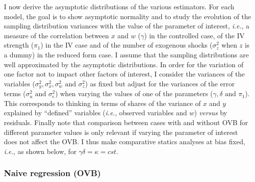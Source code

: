 \documentclass[usletter, 12pt]{article}
\begin{document}
			I now derive the asymptotic distributions of the various estimators. For each model, the goal is to show asymptotic normality and to study the evolution of the sampling distribution variances with the value of the parameter of interest, \textit{i.e.}, a measure of the correlation between $x$ and $w$ ($\gamma$) in the controlled case, of the IV strength ($\pi_{1}$) in the IV case and of the number of exogenous shocks ($\sigma_{z}^{2}$ when $z$ is a dummy) in the reduced form case. I assume that the sampling distributions are well approximated by the asymptotic distributions. %
			In order for the variation of one factor not to impact other factors of interest, I consider the variances of the variables ($\sigma_{y}^{2}, \sigma_{x}^{2}, \sigma_{w}^{2} \text{ and } \sigma_{z}^{2}$) as fixed but adjust for the variances of the error terms ($\sigma_{u}^{2} \text{ and } \sigma_{\epsilon}^{2}$) when varying the values of one of the parameters ($\gamma, \delta \text{ and } \pi_{1}$). This corresponds to thinking in terms of shares of the variance of $x$ and $y$ explained by ``defined'' variables (\textit{i.e.}, observed variables and $w$) \textit{versus} by residuals. Finally note that comparison between cases with and without OVB for different parameter values is only relevant if varying the parameter of interest does not affect the OVB. I thus make comparative statics analyses at bias fixed, \textit{i.e.}, as shown below, for $\gamma \delta = \kappa = cst$.
			

			\subsubsection{Naive regression (OVB)}\label{formal_proof_ovb}
			
\end{document}
